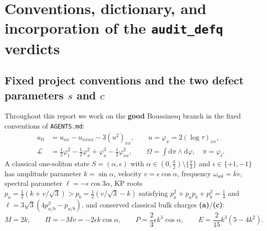 \documentclass[11pt,a4paper]{article}
\theoremstyle{remark}
\newcommand{\dd}{\mathrm{d}}
\newcommand{\La}{\textbf{(a)}}
\newcommand{\Lc}{\textbf{(c)}}
\begin{document}
\tableofcontents

\section{Conventions, dictionary, and incorporation of the \texttt{audit\_defq} verdicts}
\label{sec:conventions}

\subsection{Fixed project conventions and the two defect parameters \texorpdfstring{$s$ and $c$}{s and c}}

Throughout this report we work on the \textbf{good} Boussinesq branch in the
fixed conventions of \texttt{AGENTS.md}:
\begin{align}
  u_{tt} &= u_{xx} - u_{xxxx} - 3(u^2)_{xx}, \qquad
  u = \varphi_x = 2(\log\tau)_{xx}, \label{eq:good_bq}\\
  \mathcal{L} &= \frac{1}{2}\varphi_t^2 - \frac{1}{2}\varphi_x^2 + \varphi_x^3 - \frac{1}{2}\varphi_{xx}^2, \qquad
  \Omega = \int \dd\pi \wedge \dd\varphi, \quad \pi = \varphi_t. \label{eq:bulk_lag}
\end{align}
A classical one-soliton state $S = (\alpha,\epsilon)$ with
$\alpha \in (0,\frac{\pi}{2})\setminus\{\frac{\pi}{3}\}$ and
$\epsilon \in \{+1,-1\}$ has amplitude parameter $k = \sin\alpha$, velocity
$v = \epsilon\cos\alpha$, frequency $\omega_{\mathrm{sol}} = kv$, spectral
parameter $\ell = -\epsilon\cos 3\alpha$, KP roots
$p_a = \frac{1}{2}(k + v/\sqrt{3}) > p_b = \frac{1}{2}(v/\sqrt{3} - k)$
satisfying $p_a^2 + p_a p_b + p_b^2 = \frac{1}{4}$ and
$\ell = 3\sqrt{3}(4p_{a/b}^3 - p_{a/b})$, and conserved classical bulk charges
\La/\Lc:
\begin{equation}\label{eq:sol_data}
  M = 2k, \qquad
  \Pi = -Mv = -2\epsilon k\cos\alpha, \qquad
  P = \frac{2}{3}\epsilon k^3\cos\alpha, \qquad
  E = \frac{2}{15}k^3(5 - 4k^2).
\end{equation}
\end{document}
